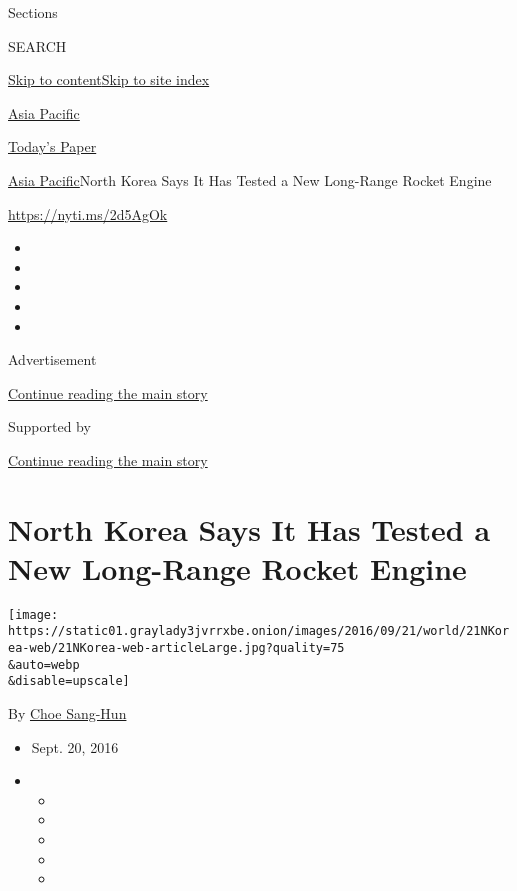 Sections

SEARCH

\protect\hyperlink{site-content}{Skip to
content}\protect\hyperlink{site-index}{Skip to site index}

\href{https://www.nytimes3xbfgragh.onion/section/world/asia}{Asia
Pacific}

\href{https://myaccount.nytimes3xbfgragh.onion/auth/login?response_type=cookie\&client_id=vi}{}

\href{https://www.nytimes3xbfgragh.onion/section/todayspaper}{Today's
Paper}

\href{/section/world/asia}{Asia Pacific}\textbar{}North Korea Says It
Has Tested a New Long-Range Rocket Engine

\url{https://nyti.ms/2d5AgOk}

\begin{itemize}
\item
\item
\item
\item
\item
\end{itemize}

Advertisement

\protect\hyperlink{after-top}{Continue reading the main story}

Supported by

\protect\hyperlink{after-sponsor}{Continue reading the main story}

\hypertarget{north-korea-says-it-has-tested-a-new-long-range-rocket-engine}{%
\section{North Korea Says It Has Tested a New Long-Range Rocket
Engine}\label{north-korea-says-it-has-tested-a-new-long-range-rocket-engine}}

\texttt{[image: https://static01.graylady3jvrrxbe.onion/images/2016/09/21/world/21NKorea-web/21NKorea-web-articleLarge.jpg?quality=75\\\&auto=webp\\\&disable=upscale]}

By \href{http://www.nytimes3xbfgragh.onion/by/choe-sang-hun}{Choe
Sang-Hun}

\begin{itemize}
\item
  Sept. 20, 2016
\item
  \begin{itemize}
  \item
  \item
  \item
  \item
  \item
  \end{itemize}
\end{itemize}

